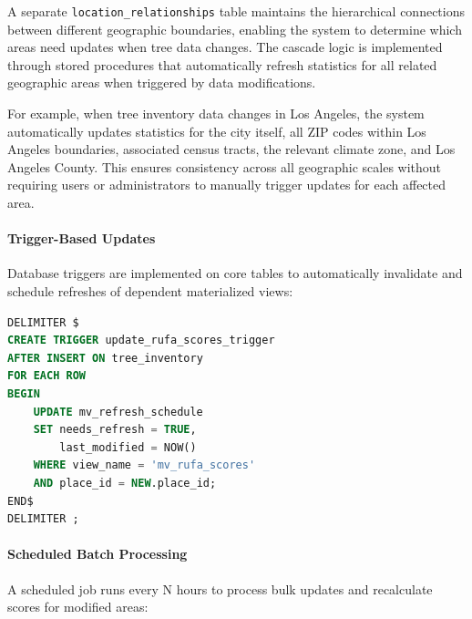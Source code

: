 A separate \texttt{location\_relationships} table maintains the hierarchical connections between different geographic boundaries, enabling the system to determine which areas need updates when tree data changes. The cascade logic is implemented through stored procedures that automatically refresh statistics for all related geographic areas when triggered by data modifications.

For example, when tree inventory data changes in Los Angeles, the system automatically updates statistics for the city itself, all ZIP codes within Los Angeles boundaries, associated census tracts, the relevant climate zone, and Los Angeles County. This ensures consistency across all geographic scales without requiring users or administrators to manually trigger updates for each affected area.

\paragraph{Trigger-Based Updates}

Database triggers are implemented on core tables to automatically invalidate and schedule refreshes of dependent materialized views:

\begin{lstlisting}[language=SQL, caption=Database trigger for automatic refresh scheduling]
DELIMITER $
CREATE TRIGGER update_rufa_scores_trigger
AFTER INSERT ON tree_inventory
FOR EACH ROW
BEGIN
    UPDATE mv_refresh_schedule 
    SET needs_refresh = TRUE, 
        last_modified = NOW()
    WHERE view_name = 'mv_rufa_scores'
    AND place_id = NEW.place_id;
END$
DELIMITER ;
\end{lstlisting}

\paragraph{Scheduled Batch Processing}

A scheduled job runs every N hours to process bulk updates and recalculate scores for modified areas:

